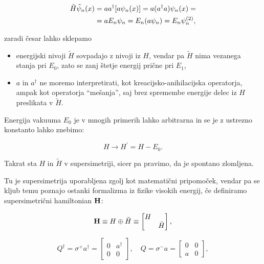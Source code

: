 \begin{align}
	\tilde{H}\tilde{\psi}_n(x) &= aa^\dagger [a\psi_n(x)] = a(a^\dagger a)\psi_n(x) = \notag \\
		&= aE_n\psi_n = E_n(a\psi_n) = E_n\psi_n^{(2)},
	\label{degenener}
\end{align}

\ni zaradi \v cesar lahko sklepamo
\begin{itemize}
	\item{energijski nivoji $\tilde{H}$ sovpadajo z nivoji iz $H$, vendar pa $\tilde{H}$ nima vezanega stanja pri
		$E_0$, zato se zanj \v stetje energij pri\v cne pri $E_1$,}
	\item{$a$ in $a^\dagger$ ne moremo interpretirati, kot kreacijsko-anihilacijska operatorja, ampak kot operatorja
		"`me\v sanja"', saj brez spremembe energije delec iz $H$ preslikata v $\tilde{H}$.}
\end{itemize}

Energija vakuuma $E_0$ je v mnogih primerih lahko arbitrarna in se je z ustrezno konstanto lahko znebimo:

\begin{equation}
	H \to H^\prime = H - E_0.
\end{equation}

\ni Takrat sta $H$ in $\tilde{H}$ v supersimetriji, sicer pa pravimo, da je spontano zlomljena.

Tu je supersimetrija uporabljena zgolj kot matemati\v cni pripomo\v cek, vendar pa se kljub temu poznajo ostanki
formalizma iz fizike visokih energij, \v ce definiramo supersimetri\v cni hamiltonian $\mathbf{H}$:

\begin{equation}
	\mathbf{H} \equiv H \oplus \tilde{H} \equiv \begin{bmatrix}H & \\
		& \tilde{H} \end{bmatrix},
\end{equation}

\begin{equation}
	Q^\dagger = \sigma^+ a^\dagger = \begin{bmatrix} 0 & a^\dagger \\
		0 & 0 \end{bmatrix}, \quad
	Q = \sigma^- a = \begin{bmatrix} 0 & 0 \\
		a & 0 \end{bmatrix},
	\label{superop}
\end{equation}

